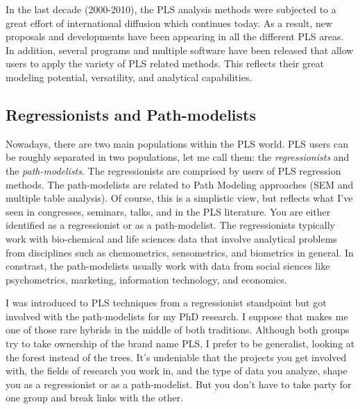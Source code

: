 \documentclass[12pt]{book}\usepackage{graphicx, color}
\begin{document}
In the last decade (2000-2010), the PLS analysis methods were subjected to a great effort of international diffusion which continues today. As a result, new proposals and developments have been appearing in all the different PLS areas. In addition, several programs and multiple software have been released that allow users to apply the variety of PLS related methods. This reflects their great modeling potential, versatility, and analytical capabilities. 



\subsection{Regressionists and Path-modelists}
Nowadays, there are two main populations within the PLS world. PLS users can be roughly separated in two populations, let me call them: the \textit{regressionists} and the \textit{path-modelists}. The regressionists are comprised by users of PLS regression methods. The path-modelists are related to Path Modeling approaches (SEM and multiple table analysis). Of course, this is a simplistic view, but reflects what I've seen in congresses, seminars, talks, and in the PLS literature. You are either identified as a regressionist or as a path-modelist. The regressionists typically work with bio-chemical and life sciences data that involve analytical problems from disciplines such as chemometrics, sensometrics, and biometrics in general. In constrast, the path-modelists usually work with data from social siences like psychometrics, marketing, information technology, and economics.

I was introduced to PLS techniques from a regressionist standpoint but got involved with the path-modelists for my PhD research. I suppose that makes me one of those rare hybrids in the middle of both traditions. Although both groups try to take ownership of the brand name PLS, I prefer to be generalist, looking at the forest instead of the trees. It's undeniable that the projects you get involved with, the fields of research you work in, and the type of data you analyze, shape you as a regressionist or as a path-modelist. But you don't have to take party for one group and break links with the other.
\end{document}
